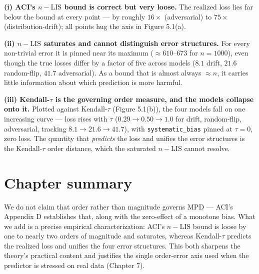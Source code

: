 \textbf{(i) ACI's \(n-\mathrm{LIS}\) bound is correct but very loose.} The realized loss lies far
below the bound at every point --- by roughly \(16\times\) (adversarial) to \(75\times\)
(distribution-drift); all points hug the axis in Figure 5.1(a).

\textbf{(ii) \(n-\mathrm{LIS}\) saturates and cannot distinguish error structures.} For every
non-trivial error it is pinned near its maximum (\(\approx610\)--\(673\) for \(n=1000\)), even
though the true losses differ by a factor of five across models (\(8.1\) drift, \(21.6\)
random-flip, \(41.7\) adversarial). As a bound that is almost always \(\approx n\), it carries
little information about which prediction is more harmful.

\textbf{(iii) Kendall-\(\tau\) is the governing order measure, and the models collapse onto it.}
Plotted against Kendall-\(\tau\) (Figure 5.1(b)), the four models fall on one increasing curve
--- loss rises with \(\tau\) (\(0.29\to0.50\to1.0\) for drift, random-flip, adversarial, tracking
\(8.1\to21.6\to41.7\)), with \texttt{systematic\_bias} pinned at \(\tau=0\), zero loss. The quantity that
\emph{predicts} the loss and unifies the error structures is the Kendall-\(\tau\) order distance,
which the saturated \(n-\mathrm{LIS}\) cannot resolve.

\section{Chapter summary}\label{chapter-summary}

We do not claim that order rather than magnitude governs MPD --- ACI's Appendix D establishes
that, along with the zero-effect of a monotone bias. What we add is a precise empirical
characterization: ACI's \(n-\mathrm{LIS}\) bound is loose by one to nearly two orders of
magnitude and saturates, whereas Kendall-\(\tau\) predicts the realized loss and unifies the
four error structures. This both sharpens the theory's practical content and justifies the
single order-error axis used when the predictor is stressed on real data (Chapter 7).
